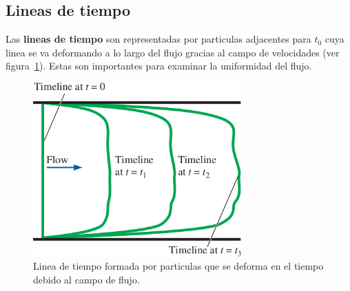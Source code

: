 \documentclass[10pt, oneside]{article}
\begin{document}
\subsection{Lineas de tiempo}
Las \textbf{lineas de tiempo} son representadas por particulas adjacentes para $t_0$  cuya linea se va deformando a lo largo del flujo gracias al campo de velocidades (ver figura~\ref{linet}). Estas son importantes para examinar la uniformidad del flujo. 
\begin{figure}[h]
\centering
\includegraphics[width=8cm]{linet}
\caption{Linea de tiempo formada por particulas que se deforma en el tiempo debido al campo de flujo.}
\label{linet}
\end{figure}
\end{document}
